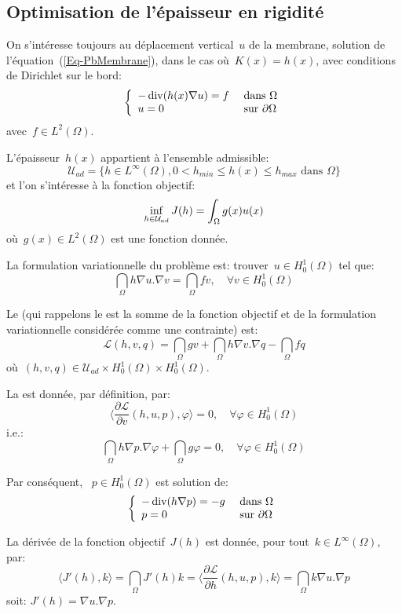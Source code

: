 \medskip
\subsection{Optimisation de l'épaisseur en rigidité}

On s'intéresse toujours au déplacement vertical~$u$ de la membrane, solution de l'équation~(\ref{Eq-PbMembrane}), dans le cas où~$K(x)=h(x)$, avec conditions de Dirichlet sur le bord:
\[\left\{\begin{array}{ll} -\operatorname{div} (h(x)\nabla u)=f &\text{ dans }\Omega\\ u=0 &\text{ sur }\partial\Omega \end{array} \right. \]
avec~$f\in L^2(\Omega)$.

L'épaisseur~$h(x)$ appartient à l'ensemble admissible:
\[ \mathcal{U}_{ad} = \{ h\in L^\infty(\Omega), 0< h_{min}\le h(x)\le h_{max} \text{ dans }\Omega \} \]
et l'on s'intéresse à la fonction objectif:
\[\colorblue \inf_{h\in\mathcal{U}_{ad}} J(h) = \dint_\Omega g(x)u(x) \]
où~$g(x)\in L^2(\Omega)$ est une fonction donnée.

\medskip
La formulation variationnelle du problème est: trouver~$u\in H^1_0(\Omega)$ tel que:
\[ \dint_\Omega h\nabla u.\nabla v=\dint_\Omega fv, \quad \forall v\in H^1_0(\Omega) \]

Le  (qui rappelons le est la somme de la fonction objectif et de la formulation variationnelle considérée comme une contrainte) est:
\[ \mathcal{L}(h,v,q) = \dint_\Omega gv + \dint_\Omega h\nabla v.\nabla q - \dint_\Omega fq \]
où~$(h,v,q)\in \mathcal{U}_{ad}\times H^1_0(\Omega)\times H^1_0(\Omega)$.

\medskip
La  est donnée, par définition, par:
\[ \langle \dfrac{\partial \mathcal{L}}{\partial v}(h,u,p),\varphi\rangle=0, \quad \forall\varphi\in H^1_0(\Omega) \]
i.e.:
\[ \dint_\Omega h\nabla p.\nabla\varphi + \dint_\Omega g\varphi =0, \quad \forall\varphi\in H^1_0(\Omega) \]

Par conséquent, ~$p\in H^1_0(\Omega)$ est solution de:
\[\left\{\begin{array}{ll}
-\operatorname{div}(h\nabla p) = -g &\text{ dans }\Omega\\
p=0 &\text{ sur }\partial\Omega
\end{array}\right.\]

\medskip
La dérivée de la fonction objectif~$J(h)$ est donnée, pour tout~$k\in L^\infty(\Omega)$, par:
\[ \langle J'(h),k\rangle = \dint_\Omega J'(h)k = \langle\dfrac{\partial\mathcal{L}}{\partial h}(h,u,p),k\rangle =\dint_\Omega k\nabla u.\nabla p \]
soit: $J'(h)=\nabla u.\nabla p$.



